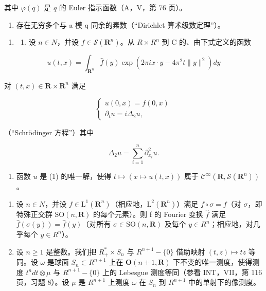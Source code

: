 其中 \(\varphi(q)\) 是 \(q\) 的 Euler 指示函数（A，V，第 76 页）。

\begin{enumerate}
\def\labelenumi{\alph{enumi})}
\setcounter{enumi}{5}
\tightlist
\item
  存在无穷多个与 a 模 q 同余的素数（“Dirichlet 算术级数定理”）。
\end{enumerate}

\begin{enumerate}
\def\labelenumi{\arabic{enumi})}
\setcounter{enumi}{17}
\tightlist
\item
  \begin{enumerate}
  \def\labelenumii{\alph{enumii})}
  \tightlist
  \item
    设 \(n \in N\)，并设 \(f \in \mathcal{S}(\mathbf{R}^{n})\)。从 \(R \times R^{n}\) 到 C 的、由下式定义的函数
  \end{enumerate}
\end{enumerate}

\[
u (t, x) = \int_ {\mathbf {R} ^ {n}} \widehat {f} (y) \exp (2 \pi i x \cdot y - 4 \pi^ {2} t \| y \| ^ {2}) d y
\]

对 \((t,x)\in\mathbf{R}\times\mathbf{R}^{n}\) 满足

\[
\left\{ \begin{array}{l} u (0, x) = f (0, x) \\ \partial_ {t} u = i \Delta_ {2} u, \end{array} \right.\tag{1}
\]

（“Schrödinger 方程”）其中

\[
\Delta_ {2} u = \sum_ {i = 1} ^ {n} \partial_ {x _ {i}} ^ {2} u.
\]

\begin{enumerate}
\def\labelenumi{\alph{enumi})}
\setcounter{enumi}{1}
\tightlist
\item
  函数 \(u\) 是 (1) 的唯一解，使得 \(t \mapsto (x \mapsto u(t,x))\) 属于 \(\mathcal{C}^{\infty}(\mathbf{R},\mathcal{S}(\mathbf{R}^{n}))\)。
\end{enumerate}

\begin{enumerate}
\def\labelenumi{\arabic{enumi})}
\setcounter{enumi}{18}
\item
  设 \(n \in N\)，并设 \(f \in \mathrm{L}^{1}(\mathbf{R}^{n})\)（相应地，\(\mathrm{L}^{2}(\mathbf{R}^{n})\)）满足 \(f \circ \sigma = f\)（对 \(\sigma\)，即特殊正交群 \(\mathrm{SO}(n, \mathbf{R})\) 的每个元素）。则 f 的 Fourier 变换 \(\widehat{f}\) 满足 \(\widehat{f}(\sigma(y)) = \widehat{f}(y)\)（对所有 \(\sigma \in \mathrm{SO}(n, \mathbf{R})\) 及每个 \(y \in R^{n}\)；相应地，对几乎每个 \(y \in R^{n}\)）。
\item
  设 \(n \geqslant 1\) 是整数。我们把 \(R_{+}^{*} \times S_{n}\) 与 \(R^{n+1} - \{0\}\) 借助映射 \((t, z) \mapsto tz\) 等同。设 \(\omega\) 是球面 \(S_{n} \subset R^{n+1}\) 上在 \(\mathbf{O}(n + 1, \mathbf{R})\) 下不变的唯一测度，使得测度 \(t^{n}dt \otimes \mu\) 与 \(R^{n+1} - \{0\}\) 上的 Lebesgue 测度等同（参看 INT，VII，第 116 页，习题 8）。设 \(\mu\) 是 \(R^{n+1}\) 上测度 \(\omega\) 在 \(S_{n}\) 到 \(R^{n+1}\) 中的单射下的像测度。
\end{enumerate}

